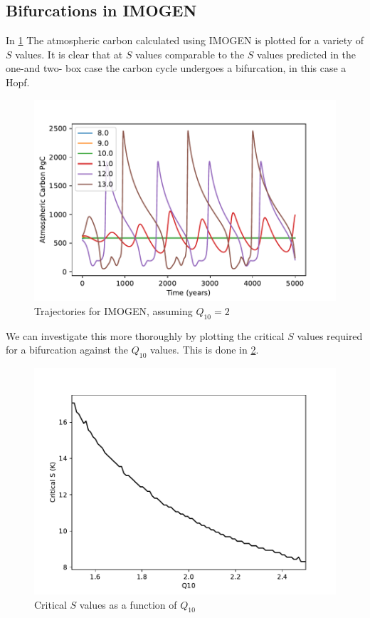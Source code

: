 \subsection{Bifurcations in IMOGEN}
In \cref{fig:imogen_trajectories} The atmospheric carbon calculated using IMOGEN is plotted for a variety of $S$ values. It is clear that at $S$ values comparable to the $S$ values
predicted in the one-and two- box case the carbon cycle undergoes a bifurcation, in this case a Hopf.
\begin{figure}
  \centering
  \includegraphics[width=\textwidth,keepaspectratio]{imogen_traj}
  \caption{Trajectories for IMOGEN, assuming $Q_{10} = 2$}
  \label{fig:imogen_trajectories}
\end{figure}
We can investigate this more thoroughly by plotting the critical $S$ values required for a bifurcation against the $Q_{10}$ values. This is done in \cref{fig:critical_S_vs_Q10}.
\begin{figure}
  \centering
  \includegraphics[width=\textwidth,keepaspectratio]{imogen_critical_values}
  \caption{Critical $S$ values as a function of $Q_{10}$}
  \label{fig:critical_S_vs_Q10}
\end{figure}

